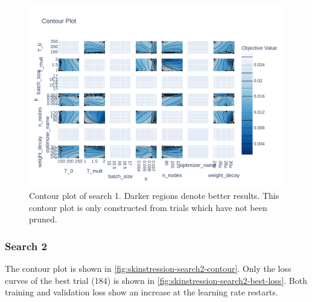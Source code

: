 \begin{figure}
    \centering
    \includegraphics[angle=90,width=0.9\textheight, height=\linewidth,keepaspectratio]{skinstression/images/hyperparameter-search/search-1/contour.pdf}
    \caption[Search 1 contour plot]{
        Contour plot of search 1.
        Darker regions denote better results.
        This contour plot is only constructed from trials which have not been pruned.
    }
    \label{fig:skinstression-search1-contour}
\end{figure}

\subsubsection{Search 2}
The contour plot is shown in \cref{fig:skinstression-search2-contour}.
Only the loss curves of the best trial (184) is shown in \cref{fig:skinstression-search2-best-loss}.
Both training and validation loss show an increase at the learning rate restarts.

